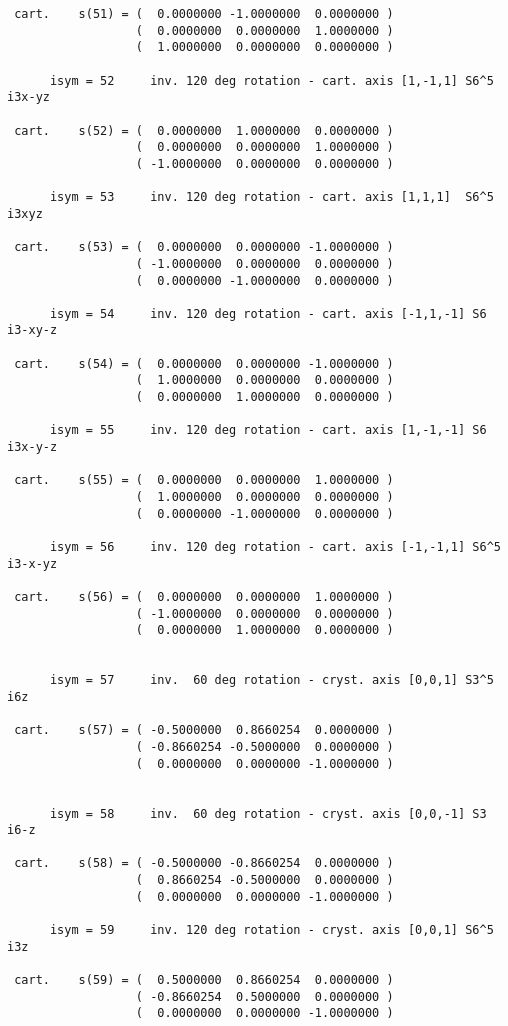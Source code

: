 \documentclass[12pt,a4paper,twoside]{report}
\begin{document}
\begin{tcolorbox}
\begin{scriptsize}
\begin{verbatim}
 cart.    s(51) = (  0.0000000 -1.0000000  0.0000000 )
                  (  0.0000000  0.0000000  1.0000000 )
                  (  1.0000000  0.0000000  0.0000000 )

      isym = 52     inv. 120 deg rotation - cart. axis [1,-1,1] S6^5   i3x-yz

 cart.    s(52) = (  0.0000000  1.0000000  0.0000000 )
                  (  0.0000000  0.0000000  1.0000000 )
                  ( -1.0000000  0.0000000  0.0000000 )

      isym = 53     inv. 120 deg rotation - cart. axis [1,1,1]  S6^5   i3xyz

 cart.    s(53) = (  0.0000000  0.0000000 -1.0000000 )
                  ( -1.0000000  0.0000000  0.0000000 )
                  (  0.0000000 -1.0000000  0.0000000 )

      isym = 54     inv. 120 deg rotation - cart. axis [-1,1,-1] S6    i3-xy-z

 cart.    s(54) = (  0.0000000  0.0000000 -1.0000000 )
                  (  1.0000000  0.0000000  0.0000000 )
                  (  0.0000000  1.0000000  0.0000000 )

      isym = 55     inv. 120 deg rotation - cart. axis [1,-1,-1] S6    i3x-y-z

 cart.    s(55) = (  0.0000000  0.0000000  1.0000000 )
                  (  1.0000000  0.0000000  0.0000000 )
                  (  0.0000000 -1.0000000  0.0000000 )

      isym = 56     inv. 120 deg rotation - cart. axis [-1,-1,1] S6^5  i3-x-yz

 cart.    s(56) = (  0.0000000  0.0000000  1.0000000 )
                  ( -1.0000000  0.0000000  0.0000000 )
                  (  0.0000000  1.0000000  0.0000000 )


      isym = 57     inv.  60 deg rotation - cryst. axis [0,0,1] S3^5   i6z

 cart.    s(57) = ( -0.5000000  0.8660254  0.0000000 )
                  ( -0.8660254 -0.5000000  0.0000000 )
                  (  0.0000000  0.0000000 -1.0000000 )


      isym = 58     inv.  60 deg rotation - cryst. axis [0,0,-1] S3    i6-z

 cart.    s(58) = ( -0.5000000 -0.8660254  0.0000000 )
                  (  0.8660254 -0.5000000  0.0000000 )
                  (  0.0000000  0.0000000 -1.0000000 )

      isym = 59     inv. 120 deg rotation - cryst. axis [0,0,1] S6^5   i3z

 cart.    s(59) = (  0.5000000  0.8660254  0.0000000 )
                  ( -0.8660254  0.5000000  0.0000000 )
                  (  0.0000000  0.0000000 -1.0000000 )


\end{verbatim}
\end{scriptsize}
\end{tcolorbox}
\end{document}
